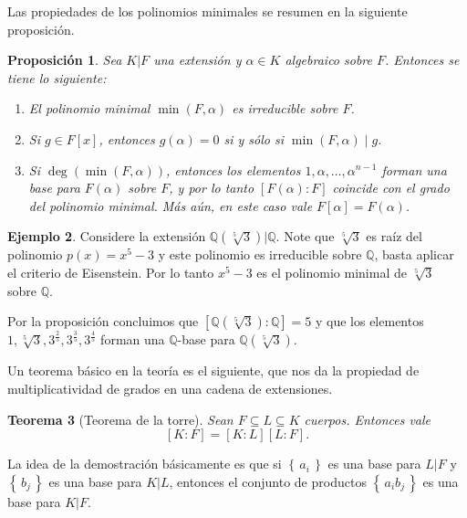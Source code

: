 \documentclass{amsbook}
\renewcommand{\.}{\cdot}
\renewcommand{\:}{\colon}               %
\newcommand{\bQ}{\mathbb{Q}}    %
\newcommand{\set}[1]{\left\{\,#1\,\right\}}    %
\newcommand{\al}{\alpha}                %
\theoremstyle{plain}
\newtheorem{Th}{Teorema}[section]   %
\newtheorem{Prop}[Th]{Proposición}     %
\theoremstyle{definition}
\newtheorem{Ex}[Th]{Ejemplo}           %
\theoremstyle{remark}
\numberwithin{equation}{section}
\begin{document}
Las propiedades de los polinomios minimales se resumen en la siguiente proposición.

\begin{Prop}
    Sea $K|F$ una extensión y $\al\in K$ algebraico sobre $F$. Entonces se tiene lo siguiente:
    \begin{enumerate}[label=(\roman*)]
        \item El polinomio minimal $\min(F,\al)$ es irreducible sobre $F$.
        \item Si $g\in F[x]$, entonces $g(\al)=0$ si y sólo si $\min(F,\al)\mid g$. 
        \item Si $\deg(\min(F,\al))$, entonces los elementos $1,\al,\dots,\al^{n-1}$ forman una base para $F(\al)$ sobre $F$, y por lo tanto $[F(\al):F]$ coincide con el grado del polinomio minimal. Más aún, en este caso vale $F[\al]=F(\al)$.
    \end{enumerate}
\end{Prop}

\begin{Ex}
    Considere la extensión $\bQ(\sqrt[5]{3})|\bQ$. Note que $\sqrt[5]{3}$ es raíz del polinomio $p(x)=x^5-3$ y este polinomio es irreducible sobre $\bQ$, basta aplicar el criterio de Eisenstein. Por lo tanto $x^5-3$ es el polinomio minimal de $\sqrt[5]{3}$ sobre $\bQ$.\par 
    Por la proposición concluimos que $[\bQ(\sqrt[5]{3}):\bQ]=5$ y que los elementos $1,\sqrt[5]{3}, 3^{\frac{2}{5}}, 3^{\frac{3}{5}}, 3^{\frac{4}{5}}$ forman una $\bQ$-base para $\bQ(\sqrt[5]{3})$.
\end{Ex}

Un teorema básico en la teoría es el siguiente, que nos da la propiedad de multiplicatividad de grados en una cadena de extensiones.

\begin{Th}[Teorema de la torre]\label{thm:towerExtDeg}
    Sean $F\subseteq L\subseteq K$ cuerpos. Entonces vale
    $$[K:F]=[K:L][L:F].$$
\end{Th}

La idea de la demostración básicamente es que si $\set{a_i}$ es una base para $L|F$ y $\set{b_j}$ es una base para $K|L$, entonces el conjunto de productos $\set{a_ib_j}$ es una base para $K|F$.
\end{document}
